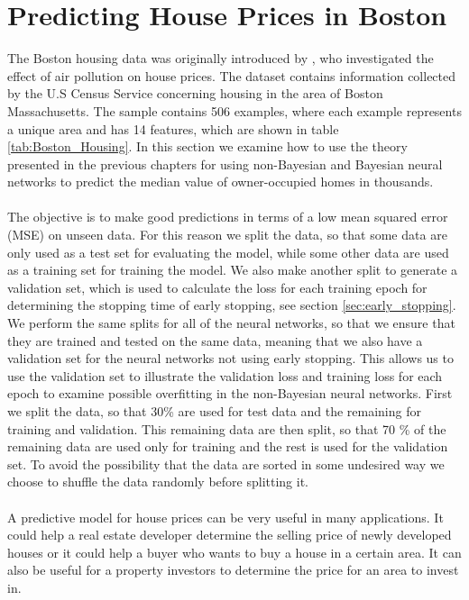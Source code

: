\section{Predicting House Prices in Boston} \label{sec:Boston_housing}
The Boston housing data was originally introduced by \cite{HARRISON197881}, who investigated the effect of air pollution on house prices.
The dataset contains information collected by the U.S Census Service concerning housing in the area of Boston Massachusetts. The sample contains 506 examples, where each example represents a unique area and has 14 features, which are shown in table \ref{tab:Boston_Housing}. In this section we examine how to use the theory presented in the previous chapters for using non-Bayesian and Bayesian neural networks to predict the median value of owner-occupied homes in thousands.  
\\
\\
The objective is to make good predictions in terms of a low mean squared error (MSE) on unseen data. For this reason we split the data, so that some data are only used as a test set for evaluating the model, while some other data are used as a training set for training the model. We also make another split to generate a validation set, which is used to calculate the loss for each training epoch for determining the stopping time of early stopping, see section \ref{sec:early_stopping}. We perform the same splits for all of the neural networks, so that we ensure that they are trained and tested on the same data, meaning that we also have a validation set for the neural networks not using early stopping. This allows us to use the validation set to illustrate the validation loss and training loss for each epoch to examine possible overfitting in the non-Bayesian neural networks. First we split the data, so that 30\% are used for test data and the remaining for training and validation. This remaining data are then split, so that 70 \% of the remaining data are used only for training and the rest is used for the validation set. To avoid the possibility that the data are sorted in some undesired way we choose to shuffle the data randomly before splitting it. 
\\
\\
 A predictive model for house prices can be very useful in many applications. It could help a real estate developer determine the selling price of newly developed houses or it could help a buyer who wants to buy a house in a certain area. It can also be useful for a property investors to determine the price for an area to invest in.
 


